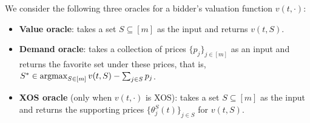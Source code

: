  \begin{definition}
 We consider the following three oracles for a bidder's valuation function $v(t,\cdot)$:
 \begin{itemize}
 	\item \textbf{Value oracle}: takes a set $S\subseteq [m]$ as the input and returns $v(t,S)$.
 	\item \textbf{Demand oracle}: takes a collection of prices $\{p_j\}_{j\in[m]}$ as an input and returns the favorite set under these prices, that is, $S^*\in \operatorname{argmax}_{S\in[m]} v(t,S)-\sum_{j\in S} p_j$.
 	\item \textbf{XOS oracle} (only when $v(t,\cdot)$ is XOS):  takes a set $S\subseteq [m]$ as the input and returns the supporting prices $\{\theta_j^{S}(t)\}_{j\in S}$ for $v(t,S)$.
 \end{itemize}
 \end{definition}

